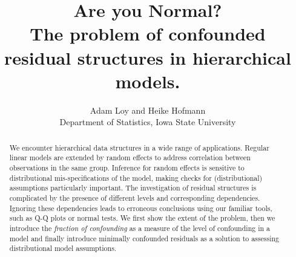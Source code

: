 \documentclass[11pt]{article} %
\title{Are you Normal? \\ {\Large The problem of confounded residual structures in hierarchical models.}}
\author{
	Adam Loy and Heike Hofmann\\
	Department of Statistics,
	Iowa State University
}
\begin{document}
\maketitle





\begin{abstract}
We encounter hierarchical data structures in a wide range of applications. Regular linear models are extended by random effects to address correlation between observations in the same group. Inference for random effects is sensitive to  distributional mis-specifications of the model, making checks for (distributional) assumptions particularly important.  The investigation of residual structures is complicated by the presence of  different levels and corresponding  dependencies. Ignoring these dependencies leads to  erroneous conclusions using our familiar tools, such as Q-Q plots or normal tests. We first show the extent of the problem, then we introduce the {\it fraction of confounding} as a measure of the level of confounding in a model and finally introduce minimally confounded residuals as a solution to assessing distributional model assumptions.


\end{abstract}

\end{document}
